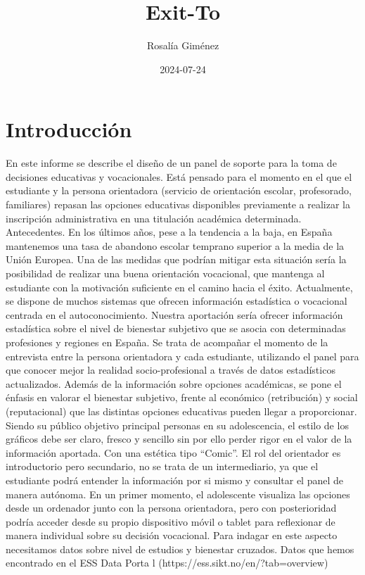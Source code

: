 \documentclass{report}
\title{Exit-To}
\author{Rosalía Giménez}
\date{2024-07-24}
\begin{document}


\maketitle

\tableofcontents

\section*{Introducción}
\normalsize
\begin{multicols}{2}
En este informe se describe el diseño de un panel de soporte para la toma de decisiones educativas
y vocacionales. Está pensado para el momento en el que el estudiante y la persona orientadora
(servicio de orientación escolar, profesorado, familiares) repasan las opciones educativas
disponibles previamente a realizar la inscripción administrativa en una titulación académica
determinada.
Antecedentes.
En los últimos años, pese a la tendencia a la baja, en
España mantenemos una tasa de abandono escolar
temprano superior a la media de la Unión Europea.
Una de las medidas que podrían mitigar esta situación
sería la posibilidad de realizar una buena orientación
vocacional, que mantenga al estudiante con la
motivación suficiente en el camino hacia el éxito.
Actualmente, se dispone de muchos sistemas que ofrecen información estadística o vocacional
centrada en el autoconocimiento. Nuestra aportación sería ofrecer información estadística sobre el
nivel de bienestar subjetivo que se asocia con determinadas profesiones y regiones en España.
Se trata de acompañar el momento de la entrevista entre la persona orientadora y cada estudiante,
utilizando el panel para que conocer mejor la realidad socio-profesional a través de datos
estadísticos actualizados.
Además de la información sobre opciones académicas, se pone el énfasis en valorar el bienestar
subjetivo, frente al económico (retribución) y social (reputacional) que las distintas opciones
educativas pueden llegar a proporcionar.
Siendo su público objetivo principal personas en su adolescencia, el estilo de los gráficos debe ser
claro, fresco y sencillo sin por ello perder rigor en el valor de la información aportada. Con una
estética tipo “Comic”.
El rol del orientador es introductorio pero secundario, no se trata de un intermediario, ya que el
estudiante podrá entender la información por si mismo y consultar el panel de manera autónoma.
En un primer momento, el adolescente visualiza las opciones desde un ordenador junto con la
persona orientadora, pero con posterioridad podría acceder desde su propio dispositivo móvil o
tablet para reflexionar de manera individual sobre su decisión vocacional.
Para indagar en este aspecto necesitamos datos sobre nivel de estudios y bienestar cruzados.
Datos que hemos encontrado en el ESS Data Porta l (https://ess.sikt.no/en/?tab=overview)
\end{multicols}
\end{document}
